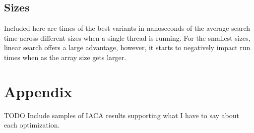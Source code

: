 \documentclass{article}
\begin{document}
\subsection{Sizes}
Included here are times of the best variants in nanoseconds of the average search time across different sizes when a single thread is running. For the smallest sizes, linear search offers a large advantage, however, it starts to negatively impact run times when as the array size gets larger.

\begin{figure}
\end{figure}



\section{Appendix}
TODO Include samples of IACA results supporting what I have to say about each optimization.
\end{document}
